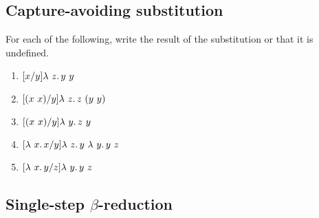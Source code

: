 \subsection{Capture-avoiding substitution}

For each of the following, write the result of the substitution or that it is undefined.

\begin{enumerate}
\item $[x/y]\lambda\ z.\, y\ y$
  
  \vspace{.5cm}

\item $[(x\ x)/y]\lam{z}{z\ (y\ y)}$

  \vspace{.5cm}

\item $[(x\ x)/y]\lam{y}{z\ y}$

  \vspace{.5cm}

\item $[\lam{x}{x}/y]\lam{z}{y\ \lam{y}{y\ z}}$

  \vspace{.5cm}

\item $[\lam{x}{y}/z]\lam{y}{y\ z}$
  \end{enumerate}


\subsection{Single-step $\beta$-reduction}

